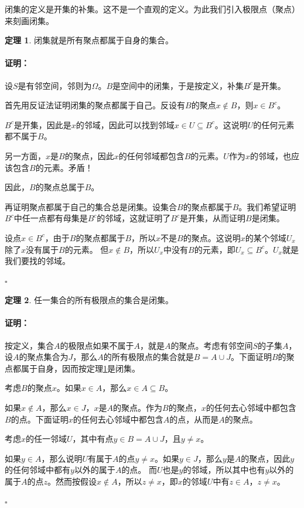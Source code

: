 \documentclass[12pt,UTF8]{ctexbook}
\theoremstyle{definition}
\newtheorem{tm}{定理}[section]
\theoremstyle{plain}
\renewenvironment{proof}{\paragraph{\textbf{证明：}}}{\hfill$\square$}
\begin{document}
\begin{appendix}
闭集的定义是开集的补集。这不是一个直观的定义。为此我们引入极限点（聚点）来刻画闭集。

\begin{tm}\label{tm:a-2-0}
    闭集就是所有聚点都属于自身的集合。
\end{tm}

\begin{proof}
    设$S$是有邻空间，邻则为$\Omega$。$B$是空间中的闭集，于是按定义，补集$B^c$是开集。

    首先用反证法证明闭集的聚点都属于自己。反设有$B$的聚点$x\notin B$，则$x\in B^c$。

    $B^c$是开集，因此是$x$的邻域，因此可以找到邻域$x\in U \subseteq B^c$。这说明$U$的任何元素都不属于$B$。

    另一方面，$x$是$B$的聚点，因此$x$的任何邻域都包含$B$的元素。$U$作为$x$的邻域，也应该包含$B$的元素。矛盾！

    因此，$B$的聚点总属于$B$。

    再证明聚点都属于自己的集合总是闭集。设集合$B$的聚点都属于$B$。我们希望证明$B^c$中任一点都有母集是$B^c$的邻域，这就证明了$B^c$是开集，从而证明$B$是闭集。

    设点$x\in B^c$，由于$B$的聚点都属于$B$，所以$x$不是$B$的聚点。这说明$x$的某个邻域$U_x$除了$x$没有属于$B$的元素。
    但$x \notin B$，所以$U_x$中没有$B$的元素，即$U_x\subseteq B^c$。$U_x$就是我们要找的邻域。

\end{proof}

\begin{tm}\label{tm:a-2-10}
    任一集合的所有极限点的集合是闭集。
\end{tm}

\begin{proof}
    按定义，集合$A$的极限点如果不属于$A$，就是$A$的聚点。考虑有邻空间$S$的子集$A$，
    设$A$的聚点集合为$J$，那么$A$的所有极限点的集合就是$B = A\cup J$。下面证明$B$的聚点都属于自身，因而按定理\ref{tm:a-2-0}是闭集。

    考虑$B$的聚点$x$。如果$x\in A$，那么$x\in A\subseteq B$。
    
    如果$x\notin A$，那么$x\in J$，$x$是$A$的聚点。作为$B$的聚点，$x$的任何去心邻域中都包含$B$的点。下面证明$x$的任何去心邻域中都包含$A$的点，从而是$A$的聚点。
    
    考虑$x$的任一邻域$U$，其中有点$y\in B = A\cup J$，且$y\neq x$。

    如果$y \in A$，那么说明$U$有属于$A$的点$y\neq x$。如果$y \in J$，那么$y$是$A$的聚点，因此$y$的任何邻域中都有$y$以外的属于$A$的点。
    而$U$也是$y$的邻域，所以其中也有$y$以外的属于$A$的点$z$。然而按假设$x\notin A$，所以$z \neq x$，即$x$的邻域$U$中有$z\in A$，$z\neq x$。


\end{proof}
\end{appendix}
\end{document}
